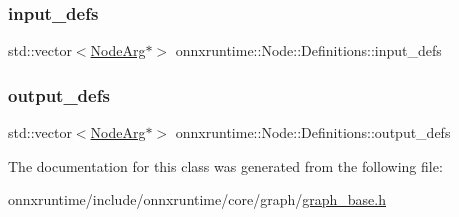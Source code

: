 \mbox{\label{classonnxruntime_1_1Node_1_1Definitions_ab512b872154564e7a66dac136ba4970b}} 
\subsubsection{\texorpdfstring{input\+\_\+defs}{input\_defs}}
{\footnotesize\ttfamily std\+::vector$<$\mbox{\hyperlink{classonnxruntime_1_1NodeArg}{Node\+Arg}}$\ast$$>$ onnxruntime\+::\+Node\+::\+Definitions\+::input\+\_\+defs}

\mbox{\label{classonnxruntime_1_1Node_1_1Definitions_a433708d9d4d85092394b54c4ffcc6258}} 
\subsubsection{\texorpdfstring{output\+\_\+defs}{output\_defs}}
{\footnotesize\ttfamily std\+::vector$<$\mbox{\hyperlink{classonnxruntime_1_1NodeArg}{Node\+Arg}}$\ast$$>$ onnxruntime\+::\+Node\+::\+Definitions\+::output\+\_\+defs}



The documentation for this class was generated from the following file\+:\begin{DoxyCompactItemize}
\item 
onnxruntime/include/onnxruntime/core/graph/\mbox{\hyperlink{graph__base_8h}{graph\+\_\+base.\+h}}\end{DoxyCompactItemize}

